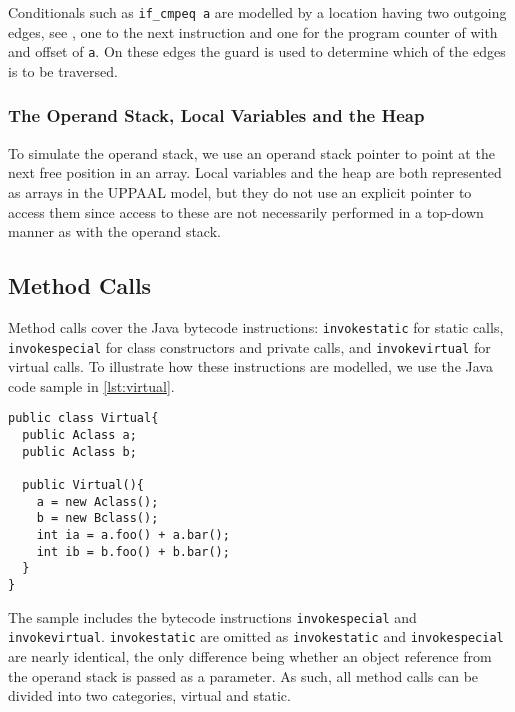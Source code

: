Conditionals such as \texttt{if\_cmpeq a} are modelled by a location having two outgoing edges, see , one to the next instruction and one for the program counter of with and offset of \texttt{a}. On these edges the guard is used to determine which of the edges is to be traversed.

\subsubsection{The Operand Stack, Local Variables and the Heap}
To simulate the operand stack, we use an operand stack pointer to point at the next free position in an array. Local variables and the heap are both represented as arrays in the UPPAAL model, but they do not use an explicit pointer to access them since access to these are not necessarily performed in a top-down manner as with the operand stack.

\subsection{Method Calls}\label{subsubsec:method}
Method calls cover the Java bytecode instructions: \texttt{invokestatic} for static calls, \texttt{invokespecial} for class constructors and private calls, and \texttt{invokevirtual} for virtual calls. To illustrate how these instructions are modelled, we use the Java code sample in \cref{lst:virtual}.
\begin{lstlisting}[caption={\texttt{Bclass} extends \texttt{Aclass}, \texttt{Aclass} implements the methods foo and bar, and \texttt{Bclass} overwrites foo.}, label={lst:virtual}]
public class Virtual{
  public Aclass a;
  public Aclass b;

  public Virtual(){
    a = new Aclass();
    b = new Bclass();
    int ia = a.foo() + a.bar();
    int ib = b.foo() + b.bar();
  }
}
\end{lstlisting}
The sample includes the bytecode instructions \texttt{invokespecial} and \texttt{invokevirtual}.
\texttt{invokestatic} are omitted as \texttt{invokestatic} and \texttt{invokespecial} are nearly identical, the only difference being whether an object reference from the operand stack is passed as a parameter.
As such, all method calls can be divided into two categories, virtual and static.

